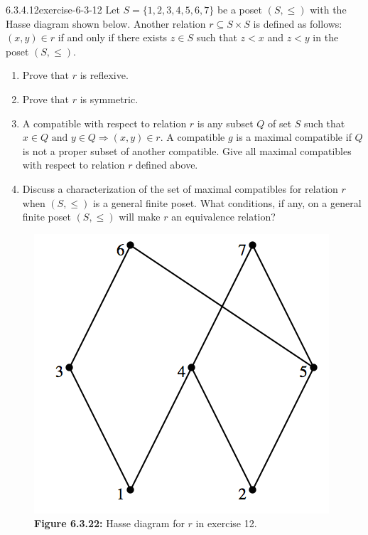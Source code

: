 \documentclass[twoside,10pt,]{book}
\numberwithin{equation}{section}
\begin{document}
\begin{divisionsolution}{6.3.4.12}{}{exercise-6-3-12}%
\hypertarget{p-2115}{}%
Let \(S = \{1,2,3,4,5,6,7\}\) be a poset \((S, \leq )\) with the Hasse diagram shown below. Another relation \(r \subseteq  S\times S\) is defined as follows: \((x, y) \in  r\) if and only if there exists \(z \in S\) such that \(z < x\) and \(z < y\) in the poset \((S, \leq )\).%
\par
\hypertarget{p-2116}{}%
\leavevmode%
\begin{enumerate}[label=(\alph*)]
\item\hypertarget{li-1122}{}\hypertarget{p-2117}{}%
Prove that \(r\) is reflexive.%
\item\hypertarget{li-1123}{}\hypertarget{p-2118}{}%
Prove that \(r\) is symmetric.%
\item\hypertarget{li-1124}{}\hypertarget{p-2119}{}%
A compatible with respect to relation \(r\) is any subset \(Q\) of set \(S\) such that \(x \in  Q \textrm{ and } y \in Q \Rightarrow  (x, y) \in r\). A compatible \(g\) is a maximal compatible if \(Q\) is not a proper subset of another compatible. Give all maximal compatibles with respect to relation \(r\) defined above.%
\item\hypertarget{li-1125}{}\hypertarget{p-2120}{}%
Discuss a characterization of the set of maximal compatibles for relation \(r\) when \((S, \leq )\) is a general finite poset. What conditions, if any, on a general finite poset \((S, \leq )\) will make \(r\) an equivalence relation?%
\end{enumerate}
%
\begin{figure}
\centering
\includegraphics[width=1\linewidth]{images/exercise-6-12.png}
\caption*{\textbf{Figure 6.3.22:} Hasse diagram for \(r\) in exercise 12.}
\end{figure}
\end{divisionsolution}%
\end{document}
